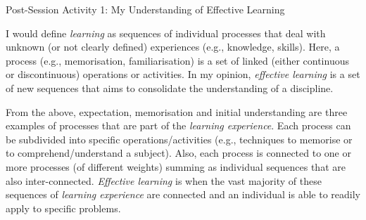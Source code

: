 \documentclass[14pt,twoside]{article}
\begin{document}
\begin{center}
{\Large Post-Session Activity 1: My Understanding of Effective Learning}
\end{center}
I would define {\it learning} as sequences of individual processes that deal with unknown (or not clearly defined) experiences (e.g., knowledge, skills). Here, a process (e.g., memorisation, familiarisation) is a set of linked (either continuous or discontinuous) operations or activities. In my opinion, {\it effective learning} is a set of new sequences that aims to consolidate the understanding of a discipline. 

From the above, expectation, memorisation and initial understanding are three examples of processes that are part of the {\it learning experience}. Each process can be subdivided into specific operations/activities (e.g., techniques to memorise or to comprehend/understand a subject). Also, each process is connected to one or more processes (of different weights) summing as individual sequences that are also inter-connected. {\it Effective learning} is when the vast majority of these sequences of {\it learning experience} are connected and an individual is able to readily apply to specific problems.   

\medskip
\end{document}
